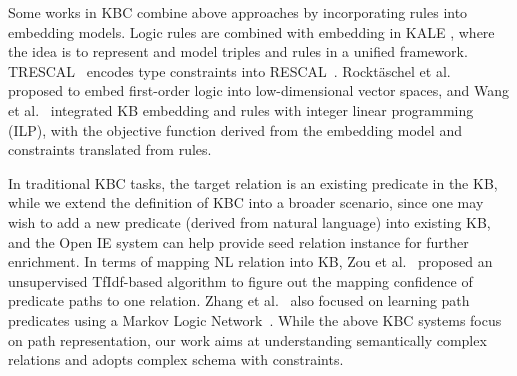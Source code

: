 Some works in KBC combine above approaches by incorporating rules into embedding models. Logic rules are combined with embedding in KALE \cite{guo2016jointly}, where the idea is to represent and model triples and rules in a unified framework. TRESCAL~\cite{chang2014typed} encodes type constraints into RESCAL~\cite{nickel2012factorizing}. Rockt\"aschel et al.~ proposed to embed first-order logic into low-dimensional vector spaces, and Wang et al.~ integrated KB embedding and rules with integer linear programming (ILP), with the objective function derived from the embedding model and constraints translated from rules.

In traditional KBC tasks, the target relation is an existing predicate in the KB,
while we extend the definition of KBC into a broader scenario, since one may wish to add
a new predicate (derived from natural language) into existing KB, and the Open IE system
can help provide seed relation instance for further enrichment.
In terms of mapping NL relation into KB, Zou et al.~ proposed an unsupervised TfIdf-based algorithm to figure out the mapping confidence of predicate paths to one relation.
Zhang et al.~ also focused on learning path predicates using a Markov Logic Network~\cite{richardson2006markov}.
While the above KBC systems focus on path representation, our work aims at understanding
semantically complex relations and adopts complex schema with constraints.




